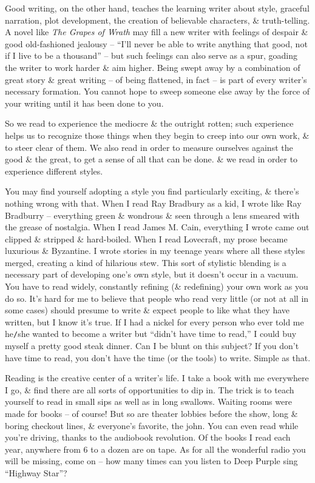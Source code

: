 \documentclass{article}
\numberwithin{equation}{section}
\begin{document}
Good writing, on the other hand, teaches the learning writer about style, graceful narration, plot development, the creation of believable characters, \& truth-telling. A novel like \textit{The Grapes of Wrath} may fill a new writer with feelings of despair \& good old-fashioned jealousy -- ``I'll never be able to write anything that good, not if I live to be a thousand'' -- but such feelings can also serve as a spur, goading the writer to work harder \& aim higher. Being swept away by a combination of great story \& great writing -- of being flattened, in fact -- is part of every writer's necessary formation. You cannot hope to sweep someone else away by the force of your writing until it has been done to you.

So we read to experience the mediocre \& the outright rotten; such experience helps us to recognize those things when they begin to creep into our own work, \& to steer clear of them. We also read in order to measure ourselves against the good \& the great, to get a sense of all that can be done. \& we read in order to experience different styles.

You may find yourself adopting a style you find particularly exciting, \& there's nothing wrong with that. When I read Ray Bradbury as a kid, I wrote like Ray Bradburry -- everything green \& wondrous \& seen through a lens smeared with the grease of nostalgia. When I read James M. Cain, everything I wrote came out clipped \& stripped \& hard-boiled. When I read Lovecraft, my prose became luxurious \& Byzantine. I wrote stories in my teenage years where all these styles merged, creating a kind of hilarious stew. This sort of stylistic blending is a necessary part of developing one's own style, but it doesn't occur in a vacuum. You have to read widely, constantly refining (\& redefining) your own work as you do so. It's hard for me to believe that people who read very little (or not at all in some cases) should presume to write \& expect people to like what they have written, but I know it's true. If I had a nickel for every person who ever told me he{\tt/}she wanted to become a writer but ``didn't have time to read,'' I could buy myself a pretty good steak dinner. Can I be blunt on this subject? If you don't have time to read, you don't have the time (or the tools) to write. Simple as that.

Reading is the creative center of a writer's life. I take a book with me everywhere I go, \& find there are all sorts of opportunities to dip in. The trick is to teach yourself to read in small sips as well as in long swallows. Waiting rooms were made for books -- of course! But so are theater lobbies before the show, long \& boring checkout lines, \& everyone's favorite, the john. You can even read while you're driving, thanks to the audiobook revolution. Of the books I read each year, anywhere from 6 to a dozen are on tape. As for all the wonderful radio you will be missing, come on -- how many times can you listen to Deep Purple sing ``Highway Star''?
\end{document}
